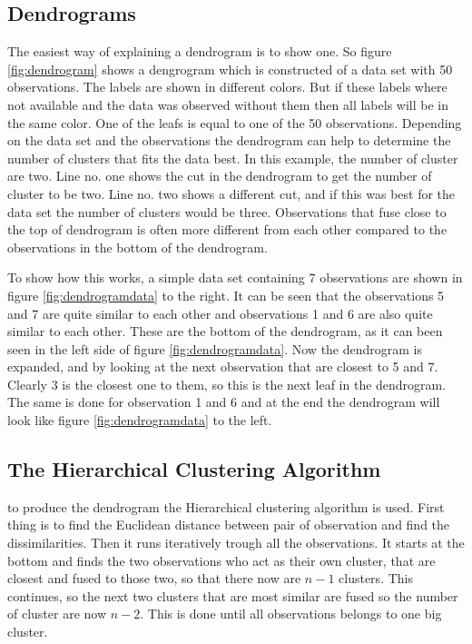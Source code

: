 \subsection{Dendrograms}
The easiest way of explaining a dendrogram is to show one. So figure \ref{fig:dendrogram} shows a dengrogram which is constructed of a data set with 50 observations.
The labels are shown in different colors. But if these labels where not available and the data was observed without them then all labels will be in the same color. 
One of the leafs is equal to one of the 50 observations. 
Depending on the data set and the observations the dendrogram can help to determine the number of clusters that fits the data best. In this example, the number of cluster are two. Line no. one shows the cut in the dendrogram to get the number of cluster to be two. Line no. two shows a different cut, and if this was best for the data set the number of clusters would be three.
Observations that fuse close to the top of dendrogram is often more different from each other compared to the observations in the bottom of the dendrogram. 


\FloatBarrier
To show how this works, a simple data set containing 7 observations are shown in figure \ref{fig:dendrogramdata} to the right.
It can be seen that the observations 5 and 7 are quite similar to each other and observations 1 and 6 are also quite similar to each other. These are the bottom of the dendrogram, as it can been seen in the left side of figure \ref{fig:dendrogramdata}. Now the dendrogram is expanded, and by looking at the next observation that are closest to 5 and 7. Clearly 3 is the closest one to them, so this is the next leaf in the dendrogram. The same is done for observation 1 and 6 and at the end the dendrogram will look like figure \ref{fig:dendrogramdata} to the left.


\FloatBarrier
\subsection{The Hierarchical Clustering Algorithm}
to produce the dendrogram the Hierarchical clustering algorithm is used. First thing is to find the Euclidean distance between pair of observation and find the dissimilarities.
Then it runs iteratively trough all the observations. It starts at the bottom and finds the two observations who act as their own cluster, that are closest and fused to those two, so that there now are $n-1$ clusters. This continues, so the next two clusters that are most similar are fused so the number of cluster are now $n-2$. This is done until all observations belongs to one big cluster.


